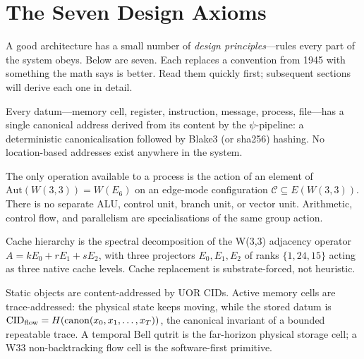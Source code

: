 \documentclass[11pt,letterpaper]{article}
\theoremstyle{remark}
\newcommand{\W}{W(3,3)}
\newcommand{\Aut}{\mathrm{Aut}}
\begin{document}
\section{The Seven Design Axioms} \label{sec:axioms}

\begin{plainenglish}
A good architecture has a small number of \emph{design principles}---rules every part of
the system obeys. Below are seven. Each replaces a convention from 1945 with something
the math says is better. Read them quickly first; subsequent sections will derive each
one in detail.
\end{plainenglish}

\begin{designprinciple}
Every datum---memory cell, register, instruction, message, process, file---has a single
canonical address derived from its content by the $\psi$-pipeline: a deterministic
canonicalisation followed by Blake3 (or sha256) hashing. No location-based addresses
exist anywhere in the system.
\end{designprinciple}

\begin{designprinciple}
The only operation available to a process is the action of an element of $\Aut(\W) =
W(E_6)$ on an edge-mode configuration $\mathcal{C} \subseteq E(\W)$. There is no separate
ALU, control unit, branch unit, or vector unit. Arithmetic, control flow, and parallelism
are specialisations of the same group action.
\end{designprinciple}

\begin{designprinciple}
Cache hierarchy is the spectral decomposition of the W(3,3) adjacency operator
$A = k E_0 + r E_1 + s E_2$, with three projectors $E_0, E_1, E_2$ of ranks
$\{1, 24, 15\}$ acting as three native cache levels. Cache replacement is
substrate-forced, not heuristic.
\end{designprinciple}

\begin{designprinciple}
Static objects are content-addressed by UOR CIDs. Active memory cells are
trace-addressed: the physical state keeps moving, while the stored datum is
$\mathrm{CID}_{\rm flow}=H(\mathrm{canon}(x_0,x_1,\ldots,x_T))$, the canonical invariant
of a bounded repeatable trace. A temporal Bell qutrit is the far-horizon physical storage
cell; a W33 non-backtracking flow cell is the software-first primitive.
\end{designprinciple}
\end{document}
